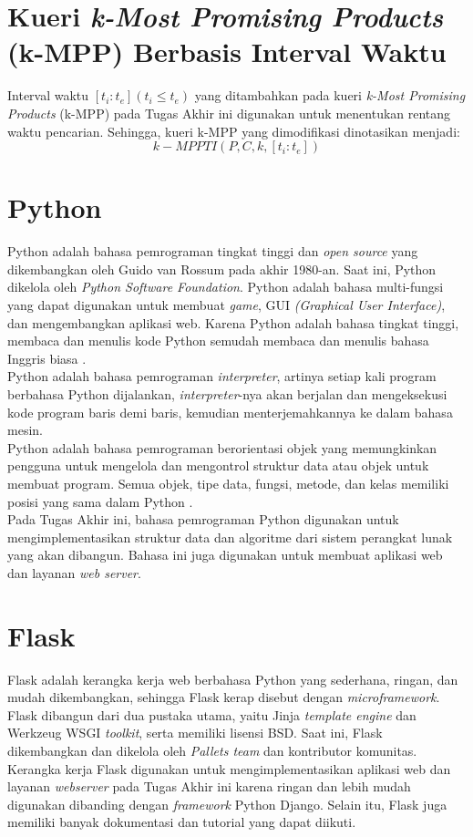 \section{Kueri \textit{k-Most Promising Products} (k-MPP) Berbasis Interval Waktu}
\tab Interval waktu $[t_i:t_e ](t_i \leq t_e)$ yang ditambahkan pada kueri \textit{k-Most Promising Products} (k-MPP) pada Tugas Akhir ini digunakan untuk menentukan rentang waktu pencarian. Sehingga, kueri k-MPP yang dimodifikasi dinotasikan menjadi:
\begin{equation}\label{eq:kmppts}
k-MPPTI(P, C, k, [t_i:t_e])
\end{equation} 

\section{Python}
\tab Python adalah bahasa pemrograman tingkat tinggi dan \textit{open source} yang dikembangkan oleh Guido van Rossum pada akhir 1980-an. Saat ini, Python dikelola oleh \textit{Python Software Foundation}. Python adalah bahasa multi-fungsi yang dapat digunakan untuk membuat \textit{game}, GUI \textit{(Graphical User Interface)}, dan mengembangkan aplikasi web. Karena Python adalah bahasa tingkat tinggi, membaca dan menulis kode Python semudah membaca dan menulis bahasa Inggris biasa \cite{python}.\\
\tab Python adalah bahasa pemrograman \textit{interpreter}, artinya setiap kali program berbahasa Python dijalankan, \textit{interpreter}-nya akan berjalan dan mengeksekusi kode program baris demi baris, kemudian menterjemahkannya ke dalam bahasa mesin.\\
\tab Python adalah bahasa pemrograman berorientasi objek yang memungkinkan pengguna untuk mengelola dan mengontrol struktur data atau objek untuk membuat program. Semua objek, tipe data, fungsi, metode, dan kelas memiliki posisi yang sama dalam Python \cite{python}.\\
\tab Pada Tugas Akhir ini, bahasa pemrograman Python digunakan untuk mengimplementasikan struktur data dan algoritme dari sistem perangkat lunak yang akan dibangun. Bahasa ini juga digunakan untuk membuat aplikasi web dan layanan \textit{web server}. 

\section{Flask}
\tab Flask adalah kerangka kerja web berbahasa Python yang sederhana, ringan, dan mudah dikembangkan, sehingga Flask kerap disebut dengan \textit{microframework}. Flask dibangun dari dua pustaka utama, yaitu Jinja \textit{template engine} dan Werkzeug WSGI \textit{toolkit}, serta memiliki lisensi BSD. Saat ini, Flask dikembangkan dan dikelola oleh \textit{Pallets team} dan kontributor komunitas. \\
\tab Kerangka kerja Flask digunakan untuk mengimplementasikan aplikasi web dan layanan \textit{webserver} pada Tugas Akhir ini karena ringan dan lebih mudah digunakan dibanding dengan \textit{framework} Python Django. Selain itu, Flask juga memiliki banyak dokumentasi dan tutorial yang dapat diikuti.